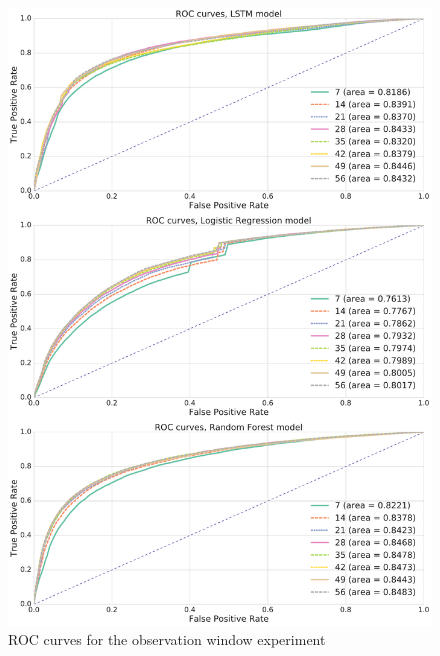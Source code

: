 \documentclass{kththesis}
\begin{document}
\begin{figure}
    \centering
    \includegraphics[width=1.0\textwidth,keepaspectratio]{figures/roc_obs_window.pdf}
    \caption{ROC curves for the observation window experiment}
    \label{fig:roc_obs_window}
\end{figure}
\end{document}
